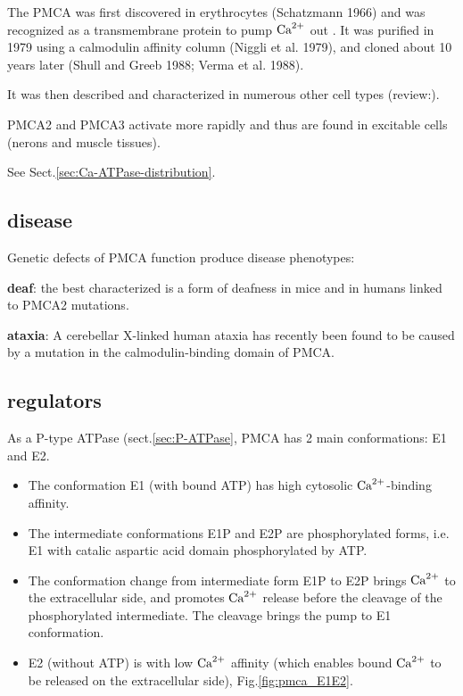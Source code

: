 The PMCA was first discovered in erythrocytes (Schatzmann 1966) and was
recognized as a transmembrane protein to pump ${\text{Ca}^{2+}}$ out \citep{schatzmann1966}.
It was purified in 1979 using a calmodulin affinity column (Niggli et al. 1979),
and cloned about 10 years later (Shull and Greeb 1988; Verma et al. 1988).

It was then described and characterized in numerous other cell types
(review:\citep{carafoli1991,carafoli1994,carafoli2000}). 

PMCA2 and PMCA3 activate more rapidly and thus are found in excitable cells
(nerons and muscle tissues).

See Sect.\ref{sec:Ca-ATPase-distribution}.


\subsection{disease}

Genetic defects of PMCA function produce disease phenotypes: 

{\bf deaf}: the best characterized is a form of deafness in mice and in humans
linked to PMCA2 mutations. 

{\bf ataxia}: A cerebellar X-linked human ataxia has recently been found to be
caused by a mutation in the calmodulin-binding domain of PMCA.

\subsection{regulators}

As a P-type ATPase (sect.\ref{sec:P-ATPase}, PMCA has 2 main conformations: E1
and E2. 
\begin{itemize}
  \item The conformation E1 (with bound ATP) has high cytosolic ${\text{Ca}^{2+}}$-binding
affinity.

  \item The intermediate conformations E1P and E2P are phosphorylated forms,
  i.e.  E1 with catalic aspartic acid domain phosphorylated by ATP. 
  
  \item The conformation change from intermediate form E1P to E2P brings ${\text{Ca}^{2+}}$
  to the extracellular side, and promotes ${\text{Ca}^{2+}}$ release before the cleavage of
  the phosphorylated intermediate.
  The cleavage brings the pump to E1 conformation.

  \item E2 (without ATP) is with low ${\text{Ca}^{2+}}$ affinity (which enables bound ${\text{Ca}^{2+}}$
  to be released on the extracellular side), Fig.\ref{fig:pmca_E1E2}.

\end{itemize}


